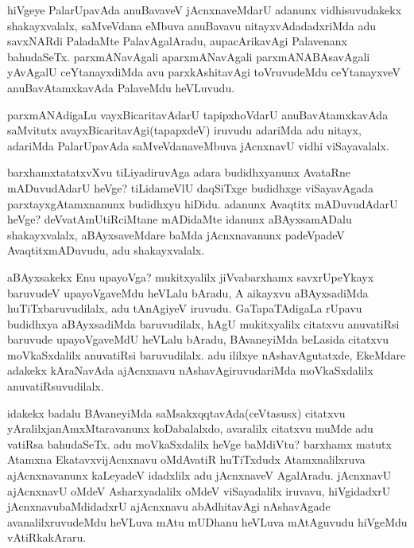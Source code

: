 \begin{artha}
hiVgeye PalarUpavAda anuBavaveV jAcnxnaveMdarU adanunx vidhisuvudakekx
shakayxvalalx, saMveVdana eMbuva anuBavavu nitayxvAdadadxriMda adu
savxNARdi PaladaMte PalavAgalAradu, aupacArikavAgi Palavenanx
bahudaSeTx. parxmANavAgali aparxmANavAgali parxmANABAsavAgali yAvAgalU
ceYtanayxdiMda avu parxkAshitavAgi toVruvudeMdu ceYtanayxveV
anuBavAtamxkavAda PalaveMdu heVLuvudu.

parxmANAdigaLu vayxBicaritavAdarU tapipxhoVdarU anuBavAtamxkavAda\break
saMvitutx avayxBicaritavAgi(tapapxdeV) iruvudu adariMda adu nitayx,
adariMda PalarUpavAda saMveVdanaveMbuva jAcnxnavU vidhi viSayavalalx.
\end{artha}

\centerline{}

\begin{artha}
barxhamxtatatxvXvu tiLiyadiruvAga adara budidhxyanunx AvataRne
mADuvudAdarU heVge? tiLidameVlU daqSiTxge budidhxge viSayavAgada
parxtayxgAtamxnanunx budidhxyu hiDidu. adanunx Avaqtitx mADuvudAdarU
heVge? deVvatAmUtiRciMtane mADidaMte idanunx aBAyxsamADalu
shakayxvalalx, aBAyxsaveMdare baMda jAcnxnavanunx padeVpadeV
AvaqtitxmADuvudu, adu shakayxvalalx.
\end{artha}

\centerline{}

\begin{artha}
aBAyxsakekx Enu upayoVga? mukitxyalilx jiVvabarxhamx savxrUpeYkayx
baruvudeV upayoVgaveMdu heVLalu bAradu, A aikayxvu aBAyxsadiMda
huTiTxbaruvudilalx, adu tAnAgiyeV iruvudu. GaTapaTAdigaLa rUpavu
budidhxya aBAyxsadiMda baruvudilalx, hAgU mukitxyalilx citatxvu
anuvatiRsi baruvude upayoVgaveMdU heVLalu bAradu, BAvaneyiMda beLasida
citatxvu moVkaSxdalilx anuvatiRsi baruvudilalx. adu ililxye
nAshavAgutatxde, EkeMdare adakekx kAraNavAda ajAcnxnavu
nAshavAgiruvudariMda moVkaSxdalilx anuvatiRsuvudilalx.

idakekx badalu BAvaneyiMda saMsakxqqtavAda(ceVtasusx) citatxvu
yAralilx\break janAmxMtaravanunx koDabalalxdo, avaralilx citatxvu muMde adu
vatiRsa bahudaSeTx. adu moVkaSxdalilx heVge baMdiVtu? barxhamx matutx
Atamxna EkatavxvijAcnxnavu oMdAvatiR huTiTxdudx Atamxnalilxruva
ajAcnxnavanunx kaLeyadeV idadxlilx adu jAcnxnaveV
AgalAradu. jAcnxnavU ajAcnxnavU oMdeV Asharxyadalilx oMdeV
viSayadalilx iruvavu, hiVgidadxrU jAcnxnavubaMdidadxrU ajAcnxnavu
abAdhitavAgi nAshavAgade avanalilxruvudeMdu heVLuva mAtu mUDhanu heVLuva
mAtAguvudu hiVgeMdu vAtiRkakAraru.
\end{artha}

